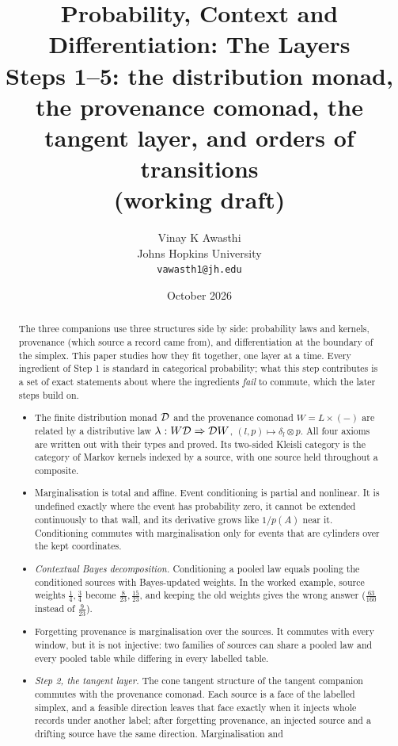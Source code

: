 \documentclass[11pt]{article}
\title{Probability, Context and Differentiation: The Layers\\[2pt]\large Steps 1--5: the distribution monad, the provenance comonad, the tangent layer, and orders of transitions\\ \normalsize (working draft)}
\author{Vinay K Awasthi\\ Johns Hopkins University\\ \texttt{vawasth1@jh.edu}}
\date{October 2026}
\theoremstyle{definition}\newtheorem{definition}[theorem]{Definition}\newtheorem{remark}[theorem]{Remark}\newtheorem{example}[theorem]{Example}
\begin{document}
\maketitle

\begin{abstract}
The three companions \cite{Lab,CoversCompanion,TangentCompanion} use three structures side by side: probability laws and kernels,
provenance (which source a record came from), and differentiation at the boundary of the simplex. This paper studies how they fit
together, one layer at a time. Every ingredient of Step 1 is standard in categorical probability; what this step contributes is a set of
exact statements about where the ingredients \emph{fail} to commute, which the later steps build on.
\begin{itemize}
\item The finite distribution monad $\mathcal D$ and the provenance comonad $W=L\times(-)$ are related by a distributive law
  $\lambda:W\mathcal D\Rightarrow\mathcal D W$, $(l,p)\mapsto\delta_l\otimes p$. All four axioms are written out with their types and proved. Its two-sided
  Kleisli category is the category of Markov kernels indexed by a source, with one source held throughout a composite.
\item Marginalisation is total and affine. Event conditioning is partial and nonlinear. It is undefined exactly where the event has
  probability zero, it cannot be extended continuously to that wall, and its derivative grows like $1/p(A)$ near it. Conditioning commutes
  with marginalisation only for events that are cylinders over the kept coordinates.
\item \emph{Contextual Bayes decomposition.} Conditioning a pooled law equals pooling the conditioned sources with Bayes-updated weights.
  In the worked example, source weights $\tfrac14,\tfrac34$ become $\tfrac8{23},\tfrac{15}{23}$, and keeping the old weights gives the wrong
  answer ($\tfrac{63}{160}$ instead of $\tfrac9{23}$).
\item Forgetting provenance is marginalisation over the sources. It commutes with every window, but it is not injective: two families of
  sources can share a pooled law and every pooled table while differing in every labelled table.
\item \emph{Step 2, the tangent layer.} The cone tangent structure of the tangent companion commutes with the provenance comonad.
  Each source is a face of the labelled simplex, and a feasible direction leaves that face exactly when it injects whole records under
  another label; after forgetting provenance, an injected source and a drifting source have the same direction. Marginalisation and

\end{itemize}
\end{abstract}
\end{document}
